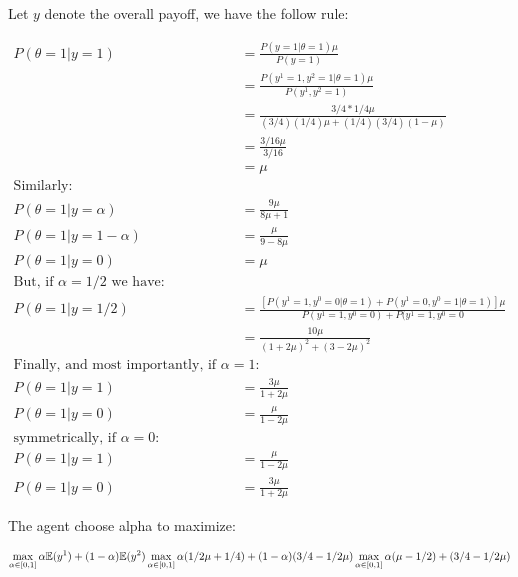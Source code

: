 \documentclass{article}
\begin{document}
Let $y$ denote the overall payoff, we have the follow rule:

\begin{equation}
\begin{split}
P(\theta = 1 | y = 1) & = \frac{P(y = 1| \theta = 1) \mu}{P(y = 1)} \\
                      & = \frac{P(y^1 = 1, y^2 = 1 | \theta = 1)\mu}{P(y^1, y^2=1)} \\
                      & = \frac{3/4*1/4\mu}{(3/4)(1/4)\mu + (1/4)(3/4)(1 - \mu)} \\
                      & = \frac{3/16\mu}{3/16} \\
                      & = \mu \\
\text{Similarly:}     & \\
P(\theta = 1|y=\alpha)& = \frac{9\mu}{8\mu + 1} \\
P(\theta=1|y=1-\alpha)& = \frac{\mu}{9 - 8\mu} \\
P(\theta = 1| y = 0)  & = \mu \\
\text{But, if $\alpha = 1/2$ we have:} \\
P(\theta = 1|y = 1/2) & = \frac{[P(y^1 = 1, y^0 = 0 | \theta = 1) +
                                P(y^1 = 0, y^0 = 1 | \theta = 1)]\mu}
                               {P(y^1 = 1, y^0 = 0) + P(y^1 = 1, y^0 = 0} \\
                      & = \frac{10\mu}{(1 + 2\mu)^2 + (3 - 2\mu)^2} \\
\text{Finally, and most importantly, if $\alpha = 1$: } & \\
P(\theta = 1|y = 1)   & = \frac{3\mu}{1 + 2\mu} \\
P(\theta = 1|y = 0)   & = \frac{\mu}{1 - 2\mu} \\
\text{symmetrically, if $\alpha = 0$: } & \\
P(\theta = 1|y = 1)   & = \frac{\mu}{1 - 2\mu} \\
P(\theta = 1|y = 0)   & = \frac{3\mu}{1 + 2\mu}
\end{split}
\end{equation}

The agent choose alpha to maximize:

\begin{equation}
  \max_{\alpha \in [0,1]} \alpha\mathbb{E}(y^1) + (1 - \alpha)\mathbb{E}(y^2) \\
  \max_{\alpha \in [0,1]} \alpha(1/2\mu + 1/4) + (1 - \alpha)(3/4 - 1/2\mu) \\
  \max_{\alpha \in [0,1]} \alpha(\mu - 1/2) + (3/4 - 1/2\mu)
\end{equation}
\end{document}
